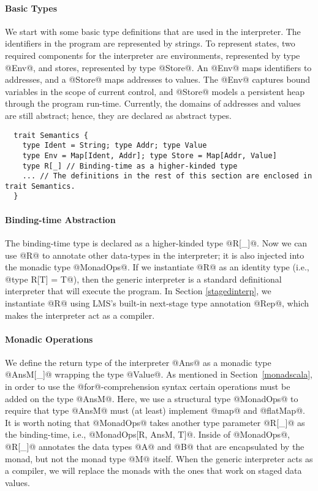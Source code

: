 \paragraph{Basic Types} We start with some basic type definitions that are used
in the interpreter. The identifiers in the program are represented by strings.
To represent states, two required components for the interpreter are
environments, represented by type @Env@, and stores, represented by type
@Store@. An @Env@ maps identifiers to addresses, and a @Store@ maps addresses to
values. The @Env@ captures bound variables in the scope of current control, and
@Store@ models a persistent heap through the program run-time.  Currently,
the domains of addresses and values are still abstract; hence, they are
declared as abstract types.
\begin{lstlisting}
  trait Semantics {
    type Ident = String; type Addr; type Value
    type Env = Map[Ident, Addr]; type Store = Map[Addr, Value]
    type R[_] // Binding-time as a higher-kinded type
    ... // The definitions in the rest of this section are enclosed in trait Semantics.
  }
\end{lstlisting}

\paragraph{Binding-time Abstraction}
The binding-time type is declared as a higher-kinded type @R[_]@.
Now we can use @R@ to annotate other data-types in the interpreter;
it is also injected into the monadic type @MonadOps@.  If we instantiate
@R@ as an identity type (i.e., @type R[T] = T@), then the generic interpreter is a
standard definitional interpreter that will execute the program.  In Section
\ref{stagedinterp}, we instantiate @R@ using LMS's built-in next-stage
type annotation @Rep@, which makes the interpreter act as a compiler.

\paragraph{Monadic Operations} We define the return type of the interpreter
@Ans@ as a monadic type @AnsM[_]@ wrapping the type @Value@.
As mentioned in Section~\ref{monadscala}, in order to use the @for@-comprehension
syntax certain operations must be added on the type @AnsM@. Here, we use a
structural type @MonadOps@ to require that type @AnsM@ must (at least)
implement @map@ and @flatMap@. It is worth noting that @MonadOps@ takes another
type parameter @R[_]@ as the binding-time, i.e., @MonadOps[R, AnsM, T]@.
Inside of @MonadOps@, @R[_]@ annotates the data types @A@ and @B@ that are
encapsulated by the monad, but not the monad type @M@ itself. When the generic
interpreter acts as a compiler, we will replace the monads with the ones that
work on staged data values.


